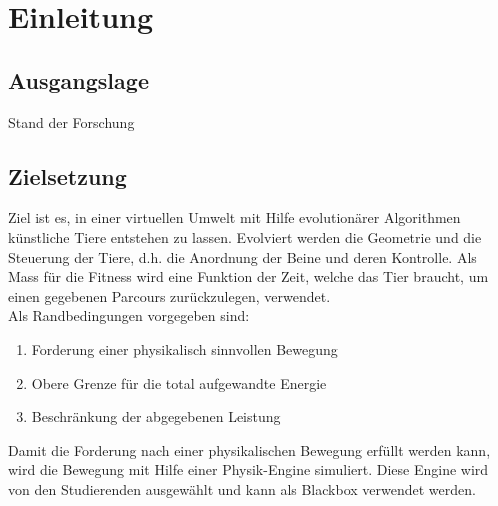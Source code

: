 %
%


\chapter{Einleitung}
\lipsum[33-37]
\section{Ausgangslage}
\lipsum[5-9]
Stand der Forschung
\section{Zielsetzung}
Ziel ist es, in einer virtuellen Umwelt mit Hilfe evolutionärer Algorithmen künstliche Tiere entstehen zu lassen.
Evolviert werden die Geometrie und die Steuerung der Tiere, d.h. die Anordnung der Beine und deren Kontrolle.
Als Mass für die Fitness wird eine Funktion der Zeit, welche das Tier braucht,
um einen gegebenen Parcours zurückzulegen, verwendet.\\
Als Randbedingungen vorgegeben sind:
\begin{enumerate}
  \item Forderung einer physikalisch sinnvollen Bewegung
  \item Obere Grenze für die total aufgewandte Energie
  \item Beschränkung der abgegebenen Leistung
\end{enumerate}
Damit die Forderung nach einer physikalischen Bewegung erfüllt werden kann,
wird die Bewegung mit Hilfe einer Physik-Engine simuliert.
Diese Engine wird von den Studierenden ausgewählt und kann als Blackbox verwendet werden.
